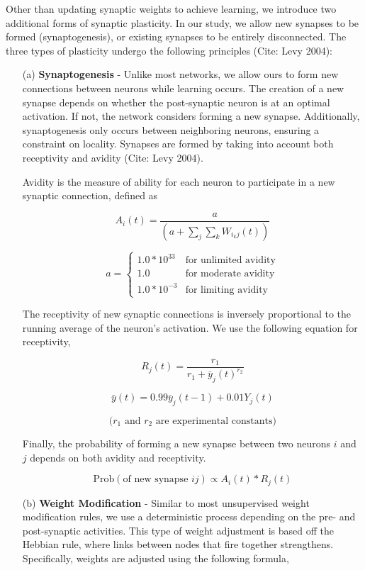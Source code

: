 \documentclass[journal]{./sty/IEEEtran}
\begin{document}
Other than updating synaptic weights to achieve learning, we introduce two additional forms of synaptic plasticity. 
In our study, we allow new synapses to be formed (synaptogenesis), or existing synapses to be entirely disconnected. 
The three types of plasticity undergo the following principles \cite{SynGen:Levy}(Cite: Levy 2004):

\begin{itemize}
\item[(a)] {\bf Synaptogenesis} - 
Unlike most networks, we allow ours to form new connections between neurons while learning occurs. 
The creation of a new synapse depends on whether the post-synaptic neuron is at an optimal activation. 
If not, the network considers forming a new synapse.
Additionally, synaptogenesis only occurs between neighboring neurons, ensuring a constraint on locality.
Synapses are formed by taking into account both receptivity and avidity \cite{SynGen:Levy}(Cite: Levy 2004).

\vspace{0.3cm}

Avidity is the measure of ability for each neuron to participate in a new synaptic connection, defined as

\[
A_i(t)=\frac{a}{(a + \sum_j\sum_kW_{i_kj}(t))}
\]

\[
a = \left\{
\begin{array}{lr}
  1.0 * 10^{33} & \text{for unlimited avidity}\\
  1.0 & \text{for moderate avidity}\\
  1.0 * 10^{-3} & \text{for limiting avidity}
\end{array}
\right.
\]

The receptivity of new synaptic connections is inversely proportional to the running average of the neuron's activation.
We use the following equation for receptivity,

\[
R_j(t) = \frac{r_1}{r_1 + \bar{y}_j(t)^{r_2}}
\]

\[
\bar{y}(t) = 0.99 \bar{y}_j(t-1) + 0.01 Y_j(t)
\]

\[
\text{(\(r_1\) and \(r_2\) are experimental constants)}
\]

Finally, the probability of forming a new synapse between two neurons \(i\) and \(j\) depends on both avidity and receptivity. 

\[
\text{Prob}(\text{of new synapse } ij ) \propto A_i(t) * R_j(t)
\]

\item[(b)] {\bf Weight Modification} - 
Similar to most unsupervised weight modification rules, we use a deterministic process depending on the pre- and post-synaptic activities.
This type of weight adjustment is based off the Hebbian rule, where links between nodes that fire together strengthens.
Specifically, weights are adjusted using the following formula,


\end{itemize}
\end{document}
